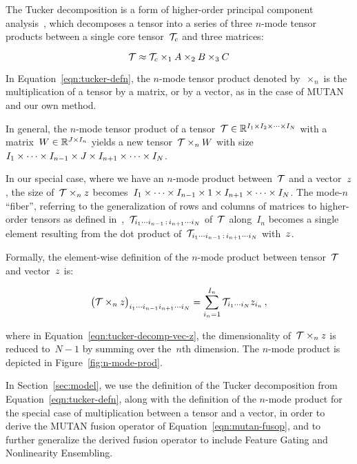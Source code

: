 The Tucker decomposition is a form of higher-order principal component
analysis~\cite{kolda2009tensor}, which decomposes a tensor into a series of
three $n$-mode tensor products between a single core tensor~$\mathcal{T}_c$ and three
matrices:

\begin{equation}
        \mathcal{T} \approx \mathcal{T}_c \times_1 A \times_2 B \times_3 C
\label{eqn:tucker-defn}
\end{equation}

In Equation~\ref{eqn:tucker-defn}, the $n$-mode tensor product denoted
by~$\times_n$ is the multiplication of a tensor by a matrix, or by a vector, as
in the case of MUTAN and our own method.

In general, the $n$-mode tensor product of a
tensor~$\mathcal{T} \in \mathbb{R}^{I_1 \times I_2 \times \cdots \times I_N}$ with a
matrix~$W \in \mathbb{R}^{J \times I_n}$ yields a new tensor~$\mathcal{T} \times_n W$ with
size~$I_1 \times \cdots \times I_{n - 1} \times J \times I_{n + 1} \times \cdots \times I_N$.

In our special case, where we have an $n$-mode product between~$\mathcal{T}$ and a
vector~$z$, the size of~$\mathcal{T} \times_n z$ becomes~$I_1 \times \cdots \times I_{n - 1} \times 1 \times I_{n + 1} \times \cdots \times I_N$. The mode-$n$
``fiber'', referring to the generalization of rows and columns of matrices to
higher-order tensors as defined in~\cite{kolda2009tensor},~$\mathcal{T}_{i_1 \cdots i_{n - 1} \,:\, i_{n + 1} \cdots i_N}$ of~$\mathcal{T}$
along~$I_n$ becomes a single element resulting from the dot product
of~$\mathcal{T}_{i_1 \cdots i_{n - 1} \,:\, i_{n + 1} \cdots i_N}$ with~$z$.

Formally, the element-wise definition of the $n$-mode product between
tensor~$\mathcal{T}$ and vector~$z$ is:

\begin{equation}
        {\big(\ensuremath{\mathcal{T}}\times_n \ensuremath{z}\big)}_{i_1 \cdots i_{n - 1} i_{n + 1} \cdots i_N} = \sum_{i_n = 1}^{I_n} \mathcal{T}_{i_1 \cdots i_N} z_{i_n} \,,
\label{eqn:tucker-decomp-vec-z}
\end{equation}

\noindent where in Equation~\ref{eqn:tucker-decomp-vec-z}, the dimensionality
of~$\mathcal{T} \times_n z$ is reduced to~$N - 1$ by summing over the~$n$th dimension.
The $n$-mode product is depicted in Figure~\ref{fig:n-mode-prod}.

In Section~\ref{sec:model}, we use the definition of the Tucker decomposition
from Equation~\ref{eqn:tucker-defn}, along with the definition of the $n$-mode
product for the special case of multiplication between a tensor and a vector,
in order to derive the MUTAN fusion operator of Equation~\ref{eqn:mutan-fusop},
and to further generalize the derived fusion operator to include Feature Gating
and Nonlinearity Ensembling.


